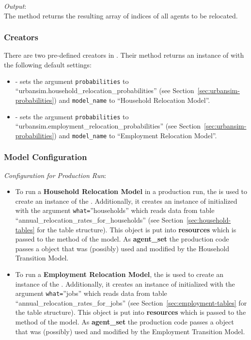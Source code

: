 {\it Output}:~\\[1mm]
The method returns the resulting array of indices of all agents to be
relocated.

%
\subsubsection{Creators}
%
There are two pre-defined creators in . Their method
 returns an instance of
 with the following default settings:
\begin{itemize}
\item {} - sets the argument
  \verb|probabilities| to ``urbansim.household_relocation_probabilities''
  (see Section~\ref{sec:urbansim-probabilities}) and \verb|model_name| to
  ``Household Relocation Model''. 
\item {} - sets the argument
  \verb|probabilities| to
  ``urbansim.employment_relocation_probabilities'' (see
  Section~\ref{sec:urbansim-probabilities}) and \verb|model_name| to
  ``Employment Relocation Model''.  
\end{itemize}

%
\subsubsection{Model Configuration}
\modelsindex
%
{\em Configuration for Production Run}:
\begin{itemize}
\item To run a {\bf Household Relocation Model} in a production run, the
   is used to create an instance of the
  . Additionally, it creates an instance of
   initialized with the argument \verb|what=|''households''
  which reads data from table ``annual_relocation_rates_for_households'' (see
  Section~\ref{sec:household-tables} for the table structure). This object is
  put into {\bf resources} which is passed to the  method of
  the model. As {\bf agent_set} the production code passes a
   object that was (possibly) used and modified by the
  Household Transition Model. 
\item To run a {\bf Employment Relocation Model}, the
   is used to create an instance of the
  . Additionally, it creates an instance of
   initialized with the argument \verb|what=|''jobs''
  which reads data from table ``annual_relocation_rates_for_jobs'' (see
  Section~\ref{sec:employment-tables} for the table structure). This object is
  put into {\bf resources} which is passed to the  method of
  the model. As {\bf agent_set} the production code passes a
   object that was (possibly) used and modified by the
  Employment Transition Model. 
\end{itemize}


